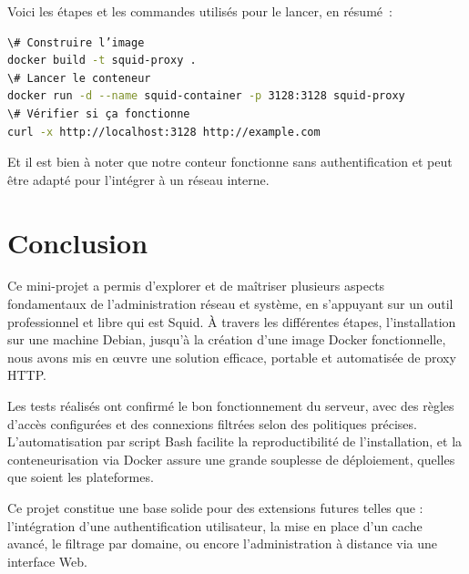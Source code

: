 \documentclass[12pt,a4paper]{article}
\begin{document}
Voici les étapes et les commandes utilisés pour le lancer, en résumé :
\begin{lstlisting}[language=bash]
\# Construire l’image
docker build -t squid-proxy .
\# Lancer le conteneur
docker run -d --name squid-container -p 3128:3128 squid-proxy
\# Vérifier si ça fonctionne
curl -x http://localhost:3128 http://example.com 
\end{lstlisting}
Et il est bien à noter que notre conteur fonctionne sans authentification et peut être adapté pour l’intégrer à un réseau interne.

\section*{Conclusion}
Ce mini-projet a permis d’explorer et de maîtriser plusieurs aspects fondamentaux de l’administration réseau et système, en s’appuyant sur un outil professionnel et libre qui est Squid. À travers les différentes étapes, l’installation sur une machine Debian, jusqu’à la création d’une image Docker fonctionnelle, nous avons mis en œuvre une solution efficace, portable et automatisée de proxy HTTP.

Les tests réalisés ont confirmé le bon fonctionnement du serveur, avec des règles d’accès configurées et des connexions filtrées selon des politiques précises. L’automatisation par script Bash facilite la reproductibilité de l’installation, et la conteneurisation via Docker assure une grande souplesse de déploiement, quelles que soient les plateformes.

Ce projet constitue une base solide pour des extensions futures telles que : l’intégration d’une authentification utilisateur, la mise en place d’un cache avancé, le filtrage par domaine, ou encore l’administration à distance via une interface Web.
\end{document}
